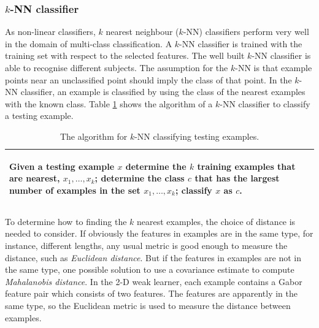 \subsubsection{$k$-NN classifier}
As non-linear classifiers, $k$ nearest neighbour ($k$-NN) classifiers perform very well in the domain of multi-class classification. A $k$-NN classifier is trained with the training set with respect to the selected features. The well built $k$-NN classifier is able to recognise different subjects. The assumption for the $k$-NN is that example points near an unclassified point should imply the class of that point. In the $k$-NN classifier, an example is classified by using the class of the nearest examples with the known class. \mbox{Table} \ref{tab:knn} shows the algorithm of a $k$-NN classifier to classify a testing example.
\begin{table}[ht]
\caption{The algorithm for $k$-NN classifying testing examples.}
\begin{tabular}{p{\columnwidth}}\\
\hline
 \begin{algorithmic}[1]
  \STATE Given a testing example $x$
  \STATE determine the $k$ training examples that are nearest, $x_{1},\ldots,x_{k}$;
  \STATE determine the class $c$ that has the largest number of examples in the set $x_{1},\ldots,x_{k}$;
  \STATE classify $x$ as $c$.
 \end{algorithmic}\\
\hline
\end{tabular}
\label{tab:knn}
\end{table} 
To determine how to finding the $k$ nearest examples, the choice of distance is needed to consider. If obviously the features in examples are in the same type, for instance, different lengths, any usual metric is good enough to measure the distance, such as \textit{Euclidean distance}. But if the features in examples are not in the same type, one possible solution to use a covariance estimate to compute \textit{Mahalanobis distance}. In the 2-D weak learner, each example contains a Gabor feature pair which consists of two features. The features are apparently in the same type, so the Euclidean metric is used to measure the distance between examples.

